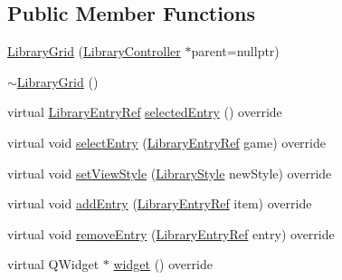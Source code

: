 \subsection*{Public Member Functions}
\begin{DoxyCompactItemize}
\item 
\mbox{\hyperlink{class_q_g_b_a_1_1_library_grid_a3cd12ceee2b445b72e0a4ad6e814928e}{Library\+Grid}} (\mbox{\hyperlink{class_q_g_b_a_1_1_library_controller}{Library\+Controller}} $\ast$parent=nullptr)
\item 
\mbox{\hyperlink{class_q_g_b_a_1_1_library_grid_ad997408b1f298cf45af0c5cf06f248ff}{$\sim$\+Library\+Grid}} ()
\item 
virtual \mbox{\hyperlink{namespace_q_g_b_a_a201fa9f2cb8f778666a134ba81909358}{Library\+Entry\+Ref}} \mbox{\hyperlink{class_q_g_b_a_1_1_library_grid_a94005ca0086b9d47e274bcf7b8bf633c}{selected\+Entry}} () override
\item 
virtual void \mbox{\hyperlink{class_q_g_b_a_1_1_library_grid_a2fa487333a0fffa668823370c73477c1}{select\+Entry}} (\mbox{\hyperlink{namespace_q_g_b_a_a201fa9f2cb8f778666a134ba81909358}{Library\+Entry\+Ref}} game) override
\item 
virtual void \mbox{\hyperlink{class_q_g_b_a_1_1_library_grid_a5a2c5ce5dcd4452e7971f8eff5c3c7bd}{set\+View\+Style}} (\mbox{\hyperlink{namespace_q_g_b_a_a4804d48d02699a2c1d2436e9269a8bb8}{Library\+Style}} new\+Style) override
\item 
virtual void \mbox{\hyperlink{class_q_g_b_a_1_1_library_grid_a7499ff69eaf0427c1fd5b09eb7812909}{add\+Entry}} (\mbox{\hyperlink{namespace_q_g_b_a_a201fa9f2cb8f778666a134ba81909358}{Library\+Entry\+Ref}} item) override
\item 
virtual void \mbox{\hyperlink{class_q_g_b_a_1_1_library_grid_a277472016829a03006aea069ffd360fa}{remove\+Entry}} (\mbox{\hyperlink{namespace_q_g_b_a_a201fa9f2cb8f778666a134ba81909358}{Library\+Entry\+Ref}} entry) override
\item 
virtual Q\+Widget $\ast$ \mbox{\hyperlink{class_q_g_b_a_1_1_library_grid_ad2502591d78d5f1dcef0e68ecece6fa1}{widget}} () override
\end{DoxyCompactItemize}

